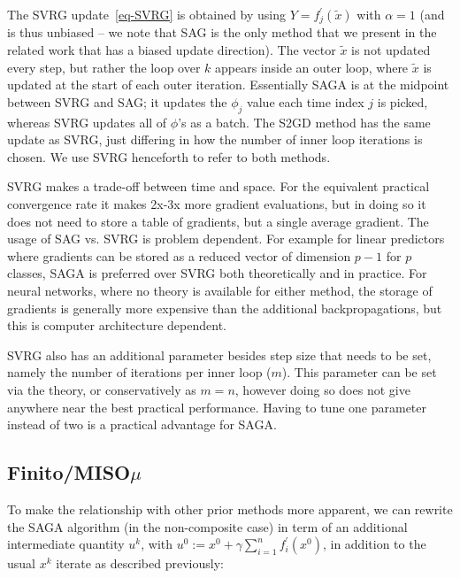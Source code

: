 \documentclass{article}
\newcommand{\stepsize}{\gamma} %
\begin{document}
The SVRG update~\eqref{eq-SVRG} is obtained by using $Y=f_{j}^{\prime}(\tilde{x})$ with $\alpha=1$ (and is thus unbiased -- we note that SAG is the only method that we present in the related work that has a biased update direction).
The vector $\tilde{x}$ is not updated every step, but rather the loop over $k$ appears inside an outer loop, where $\tilde{x}$ is updated at the start of each outer iteration. Essentially SAGA is at the midpoint between SVRG and SAG; it updates the $\phi_{j}$ value each time index $j$ is picked, whereas SVRG updates all of $\phi$'s as a batch. 
The S2GD method \citep{semi} has the same update as SVRG, just differing in how the number of inner loop iterations is chosen. We use SVRG henceforth to refer to both methods.

SVRG makes a trade-off between time and space. For the equivalent practical convergence rate it makes 2x-3x more gradient evaluations, but in doing so it does not need to store a table of gradients, but a single average gradient. The usage of SAG vs. SVRG is problem dependent. For example for linear predictors where gradients can be stored as a reduced vector of dimension $p-1$ for $p$ classes, SAGA  is preferred over SVRG both theoretically and in practice. For neural networks, where no theory is available for either method, the storage of gradients is generally more expensive than the additional backpropagations, but this is computer architecture dependent. 

SVRG also has an additional parameter besides step size that needs to be set, namely the number of iterations per inner loop ($m$). This parameter can be set via the theory, or conservatively as $m=n$, however doing so does not give anywhere near the best practical performance. Having to tune one parameter instead of two is a practical advantage for SAGA.

\subsection*{Finito/MISO$\mu$ }
\label{subsec:finito}
To make the relationship with other prior methods more apparent, we can rewrite the SAGA algorithm (in the non-composite case) in term of an additional intermediate quantity $u^{k}$, with $u^{0} := x^{0}+ \stepsize \sum_{i=1}^{n}f_{i}^{\prime}(x^{0})$, in addition to the usual $x^{k}$ iterate as described previously: 
\end{document}
